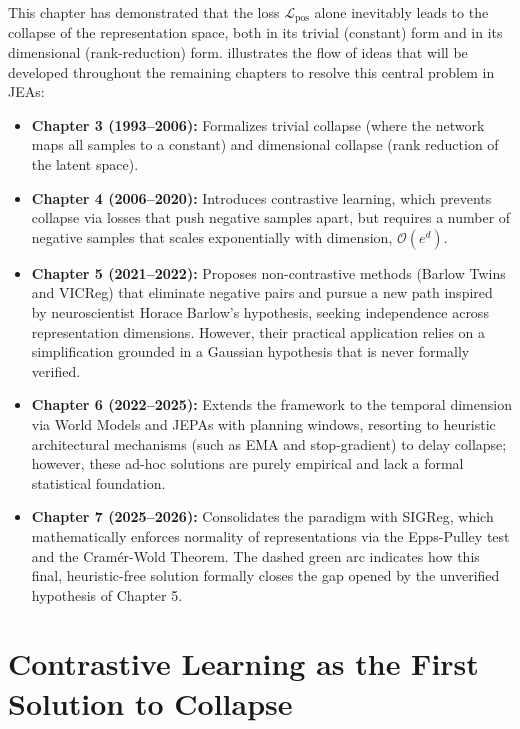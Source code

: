 \documentclass[11pt, oneside, openany]{book}
\begin{document}
This chapter has demonstrated that the loss $\mathcal{L}_{\text{pos}}$ alone inevitably leads to the collapse of the representation space, both in its trivial (constant) form and in its dimensional (rank-reduction) form.  illustrates the flow of ideas that will be developed throughout the remaining chapters to resolve this central problem in JEAs:
\begin{itemize}
    \item \textbf{Chapter 3 (1993--2006):} Formalizes trivial collapse (where the network maps all samples to a constant) and dimensional collapse (rank reduction of the latent space).
    \item \textbf{Chapter 4 (2006--2020):} Introduces contrastive learning, which prevents collapse via losses that push negative samples apart, but requires a number of negative samples that scales exponentially with dimension, $\mathcal{O}(e^{d})$.
    \item \textbf{Chapter 5 (2021--2022):} Proposes non-contrastive methods (Barlow Twins and VICReg) that eliminate negative pairs and pursue a new path inspired by neuroscientist Horace Barlow's hypothesis, seeking independence across representation dimensions. However, their practical application relies on a simplification grounded in a Gaussian hypothesis that is never formally verified.
    \item \textbf{Chapter 6 (2022--2025):} Extends the framework to the temporal dimension via World Models and JEPAs with planning windows, resorting to heuristic architectural mechanisms (such as EMA and stop-gradient) to delay collapse; however, these ad-hoc solutions are purely empirical and lack a formal statistical foundation.
    \item \textbf{Chapter 7 (2025--2026):} Consolidates the paradigm with SIGReg, which mathematically enforces normality of representations via the Epps-Pulley test and the Cram\'er-Wold Theorem. The dashed green arc indicates how this final, heuristic-free solution formally closes the gap opened by the unverified hypothesis of Chapter 5.
\end{itemize}

\chapter{Contrastive Learning as the First Solution to Collapse}
\label{chap:4}
\end{document}
